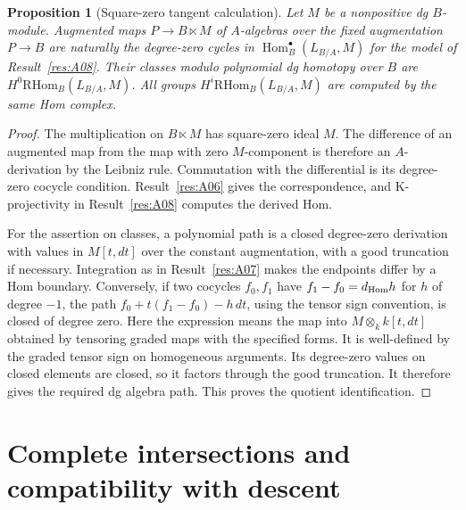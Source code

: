 \documentclass[11pt,oneside,openany]{book}
\newtheorem{proposition}[theorem]{Proposition}
\theoremstyle{definition}
\theoremstyle{remark}
\begin{document}
\begin{proposition}[Square-zero tangent calculation]\label{res:A10}
Let \(M\) be a nonpositive dg \(B\)-module. Augmented maps
\(P\to B\ltimes M\) of \(A\)-algebras over the fixed augmentation
\(P\to B\) are naturally the degree-zero cycles in
\(\operatorname{Hom}_B^\bullet(L_{B/A},M)\) for the model of
Result~\ref{res:A08}. Their classes modulo polynomial dg homotopy
over \(B\) are \(H^0\mathrm{RHom}_B(L_{B/A},M)\).
All groups \(H^i\mathrm{RHom}_B(L_{B/A},M)\) are computed by the
same Hom complex.
\end{proposition}
\begin{proof}
The multiplication on \(B\ltimes M\) has square-zero ideal \(M\).
The difference of an augmented map from the map with zero
\(M\)-component is therefore an \(A\)-derivation by the Leibniz rule.
Commutation with the differential is its degree-zero cocycle
condition. Result~\ref{res:A06} gives the correspondence, and
K-projectivity in Result~\ref{res:A08} computes the derived Hom.

For the assertion on classes, a polynomial path is a closed
degree-zero derivation with values in \(M[t,dt]\) over the
constant augmentation, with a good truncation if necessary.
Integration as in Result~\ref{res:A07} makes the endpoints differ
by a Hom boundary. Conversely, if two cocycles \(f_0,f_1\) have
\(f_1-f_0=d_{\rm Hom}h\) for \(h\) of degree \(-1\), the path
\(f_0+t(f_1-f_0)-h\,dt\), using the tensor sign convention, is
closed of degree zero. Here the expression means the map into
\(M\otimes_k k[t,dt]\) obtained by tensoring graded maps with the
specified forms. It is well-defined by the graded tensor sign
on homogeneous arguments. Its degree-zero values on closed
elements are closed, so it factors through the good truncation.
It therefore gives the required dg algebra path. This proves
the quotient identification.
\end{proof}

\section{Complete intersections and compatibility with descent}
\end{document}
